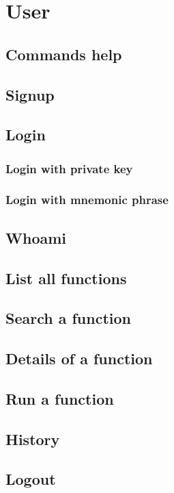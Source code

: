 \section{User}

\subsection{Commands help}

\subsection{Signup}

\subsection{Login}

\subsubsection{Login with private key}

\subsubsection{Login with mnemonic phrase}

\subsection{Whoami}

\subsection{List all functions}

\subsection{Search a function}

\subsection{Details of a function}

\subsection{Run a function}

\subsection{History}

\subsection{Logout}